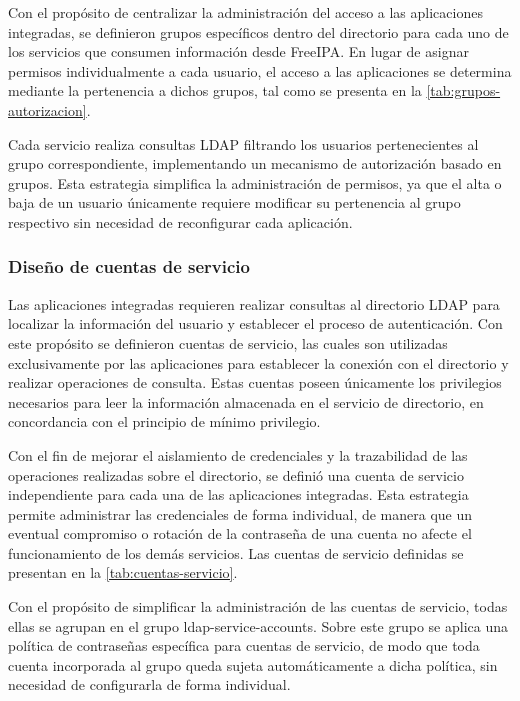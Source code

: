 Con el propósito de centralizar la administración del acceso a las aplicaciones integradas, se definieron grupos específicos dentro del directorio para cada uno de los servicios que consumen información desde FreeIPA. En lugar de asignar permisos individualmente a cada usuario, el acceso a las aplicaciones se determina mediante la pertenencia a dichos grupos, tal como se presenta en la \autoref{tab:grupos-autorizacion}.



Cada servicio realiza consultas \ac{LDAP} filtrando los usuarios pertenecientes al grupo correspondiente, implementando un mecanismo de autorización basado en grupos. Esta estrategia simplifica la administración de permisos, ya que el alta o baja de un usuario únicamente requiere modificar su pertenencia al grupo respectivo sin necesidad de reconfigurar cada aplicación.

\subsubsection{Diseño de cuentas de servicio}

Las aplicaciones integradas requieren realizar consultas al directorio \ac{LDAP} para localizar la información del usuario y establecer el proceso de autenticación. Con este propósito se definieron cuentas de servicio, las cuales son utilizadas exclusivamente por las aplicaciones para establecer la conexión con el directorio y realizar operaciones de consulta. Estas cuentas poseen únicamente los privilegios necesarios para leer la información almacenada en el servicio de directorio, en concordancia con el principio de mínimo privilegio.

Con el fin de mejorar el aislamiento de credenciales y la trazabilidad de las operaciones realizadas sobre el directorio, se definió una cuenta de servicio independiente para cada una de las aplicaciones integradas. Esta estrategia permite administrar las credenciales de forma individual, de manera que un eventual compromiso o rotación de la contraseña de una cuenta no afecte el funcionamiento de los demás servicios. Las cuentas de servicio definidas se presentan en la \autoref{tab:cuentas-servicio}.



Con el propósito de simplificar la administración de las cuentas de servicio, todas ellas se agrupan en el grupo ldap-service-accounts. Sobre este grupo se aplica una política de contraseñas específica para cuentas de servicio, de modo que toda cuenta incorporada al grupo queda sujeta automáticamente a dicha política, sin necesidad de configurarla de forma individual.

